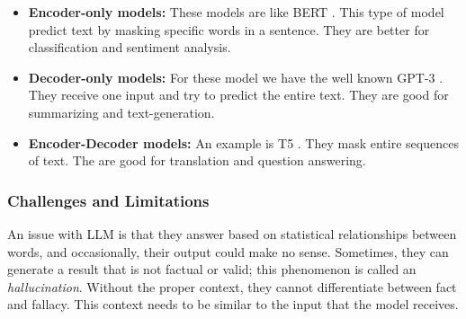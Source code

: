 \begin{itemize}
\item{\textbf{Encoder-only models:}} These models are like BERT \cite{DBLP:journals/corr/abs-1810-04805}. This type of model predict text by masking specific words in a sentence. They are better for classification and sentiment analysis.
\item{\textbf{Decoder-only models:}} For these model we have the well known GPT-3 \cite{DBLP:journals/corr/abs-2005-14165}. They receive one input and try to predict the entire text. They are good for summarizing and text-generation.
\item{\textbf{Encoder-Decoder models:}} An example is T5 \cite{2020t5}. They mask entire sequences of text. The are good for translation and question  answering.
\end{itemize}




\subsubsection{Challenges and Limitations}
An issue with LLM is that they answer based on statistical relationships between words, and occasionally, their output could make no sense. Sometimes, they can generate a result that is not factual
or valid; this phenomenon is called an {\em hallucination}. Without the proper context, they cannot differentiate between fact and fallacy. This context needs to be similar to the input that the model
receives. 

